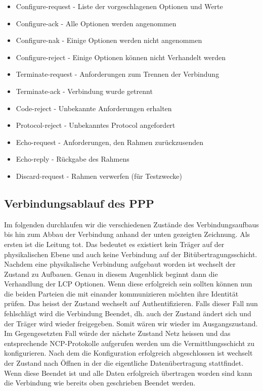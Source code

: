\documentclass[12pt, a4paper, ngerman]{article}
\begin{document}
\begin{itemize}
	\item Configure-request	- Liste der vorgeschlagenen Optionen und Werte
	\item Configure-ack		- Alle Optionen werden angenommen
	\item	Configure-nak		- Einige Optionen werden nicht angenommen
	\item Configure-reject	- Einige Optionen können nicht Verhandelt werden
	\item Terminate-request	- Anforderungen zum Trennen der Verbindung
	\item Terminate-ack		- Verbindung wurde getrennt
	\item Code-reject		- Unbekannte Anforderungen erhalten
	\item Protocol-reject		- Unbekanntes Protocol angefordert
	\item Echo-request		- Anforderungen, den Rahmen zurückzusenden
	\item Echo-reply		- Rückgabe des Rahmens
	\item	Discard-request	- Rahmen verwerfen (für Testzwecke)
\end{itemize} 



\subsection{Verbindungsablauf des PPP}

Im folgenden durchlaufen wir die verschiedenen Zustände des Verbindungsaufbaus bis hin zum Abbau der Verbindung anhand der unten gezeigten Zeichnung.
Als ersten ist die Leitung tot. Das bedeutet es existiert kein Träger auf der physikalischen Ebene und auch keine Verbindung auf der Bitübertragungsschicht.
Nachdem eine physikalische Verbindung aufgebaut worden ist wechselt der Zustand zu Aufbauen. Genau in diesem Augenblick beginnt dann die Verhandlung der LCP Optionen. Wenn diese erfolgreich sein sollten können nun die beiden Parteien die mit einander kommunizieren möchten ihre Identität prüfen. Das heisst der Zustand wechselt auf Authentifizieren. Falls dieser Fall nun fehlschlägt wird die Verbindung Beendet, dh. auch der Zustand ändert sich und der Träger wird wieder freigegeben. Somit wären wir wieder im Ausgangszustand. Im Gegengesetzten Fall würde der nächste Zustand Netz heissen und das entsprechende NCP-Protokolle aufgerufen werden um die Vermittlungsschicht zu konfigurieren. Nach dem die Konfiguration erfolgreich abgeschlossen ist wechselt der Zustand nach Öffnen in der die eigentliche Datenübertragung stattfindet. Wenn diese Beendet ist und alle Daten erfolgreich übertragen worden sind kann die Verbindung wie bereits oben geschrieben Beendet werden.
\end{document}
